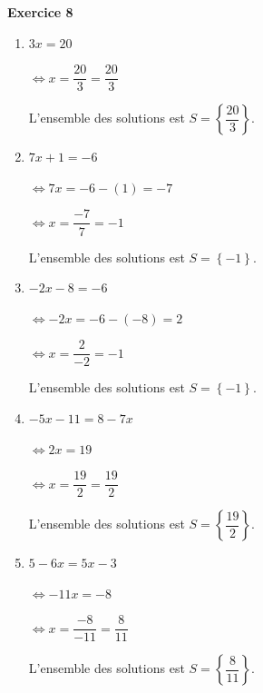 \documentclass[12pt,a4paper,french]{article}
\begin{document}
\noindent\textbf{Exercice 8}\par
\smallskip
\begin{enumerate}
\item $3x = 20$

$\Leftrightarrow x = \dfrac{20}{3} = \dfrac{20}{3}$

L'ensemble des solutions est $S = \left\{\dfrac{20}{3}\right\}$.

\item $7x + 1 = -6$

$\Leftrightarrow 7x = -6 - (1) = -7$

$\Leftrightarrow x = \dfrac{-7}{7} = -1$

L'ensemble des solutions est $S = \left\{-1\right\}$.

\item $-2x - 8 = -6$

$\Leftrightarrow -2x = -6 - (-8) = 2$

$\Leftrightarrow x = \dfrac{2}{-2} = -1$

L'ensemble des solutions est $S = \left\{-1\right\}$.

\item $-5x - 11 = 8 - 7x$

$\Leftrightarrow 2x = 19$

$\Leftrightarrow x = \dfrac{19}{2} = \dfrac{19}{2}$

L'ensemble des solutions est $S = \left\{\dfrac{19}{2}\right\}$.

\item $5 - 6x = 5x - 3$

$\Leftrightarrow -11x = -8$

$\Leftrightarrow x = \dfrac{-8}{-11} = \dfrac{8}{11}$

L'ensemble des solutions est $S = \left\{\dfrac{8}{11}\right\}$.

\end{enumerate}
\medskip
\end{document}
